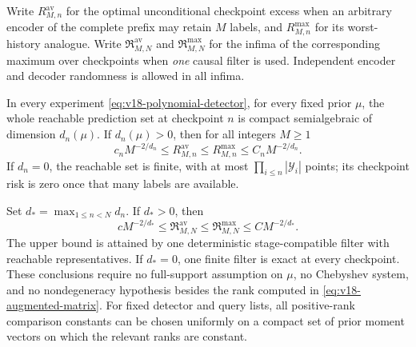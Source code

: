 Write $R^{\mathrm{av}}_{M,n}$ for the optimal unconditional checkpoint
excess when an arbitrary encoder of the complete prefix may retain
$M$ labels, and $R^{\mathrm{max}}_{M,n}$ for its worst-history analogue.
Write $\mathfrak R^{\mathrm{av}}_{M,N}$ and
$\mathfrak R^{\mathrm{max}}_{M,N}$ for the infima of the corresponding
maximum over checkpoints when \emph{one} causal filter is used.
Independent encoder and decoder randomness is allowed in all infima.

\begin{theorem}\label{thm:v18-rank-classification}
In every experiment \eqref{eq:v18-polynomial-detector}, for every fixed
prior $\mu$, the whole reachable prediction set at checkpoint $n$ is
compact semialgebraic of dimension $d_n(\mu)$. If $d_n(\mu)>0$, then
for all integers $M\ge1$
\begin{equation}\label{eq:v18-checkpoint-rank-law}
 c_nM^{-2/d_n}\le R^{\mathrm{av}}_{M,n}
 \le R^{\mathrm{max}}_{M,n}\le C_nM^{-2/d_n}.
\end{equation}
If $d_n=0$, the reachable set is finite, with at most
$\prod_{i\le n}|\mathcal Y_i|$ points; its checkpoint risk is zero once
that many labels are available.

Set $d_* =\max_{1\le n<N}d_n$. If $d_*>0$, then
\begin{equation}\label{eq:v18-causal-rank-law}
 cM^{-2/d_*}\le\mathfrak R^{\mathrm{av}}_{M,N}
 \le\mathfrak R^{\mathrm{max}}_{M,N}\le CM^{-2/d_*}.
\end{equation}
The upper bound is attained by one deterministic stage-compatible
filter with reachable representatives. If $d_*=0$, one finite filter is
exact at every checkpoint. These conclusions require no full-support
assumption on $\mu$, no Chebyshev system, and no nondegeneracy
hypothesis besides the rank computed in \eqref{eq:v18-augmented-matrix}.
For fixed detector and query lists, all positive-rank comparison
constants can be chosen uniformly on a compact set of prior moment
vectors on which the relevant ranks are constant.
\end{theorem}

